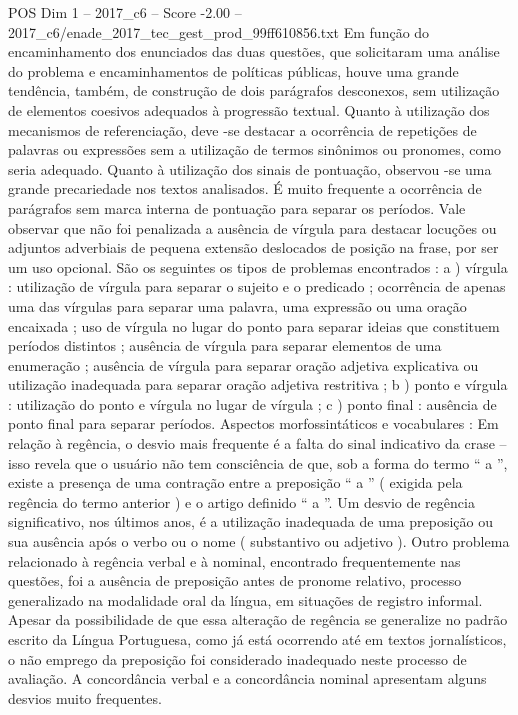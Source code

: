 \begin{textsample}{POS Dim 1 – 2017\_c6 – Score -2.00 – 2017\_c6/enade\_2017\_tec\_gest\_prod\_99ff610856.txt}
Em função do encaminhamento dos enunciados das duas questões, que solicitaram uma análise do problema e encaminhamentos de políticas públicas, houve uma grande tendência, também, de construção de dois parágrafos desconexos, sem utilização de elementos coesivos adequados à progressão textual.
Quanto à utilização dos mecanismos de referenciação, deve -se destacar a ocorrência de repetições de palavras ou expressões sem a utilização de termos sinônimos ou pronomes, como seria adequado.
Quanto à utilização dos sinais de pontuação, observou -se uma grande precariedade nos textos analisados.
É muito frequente a ocorrência de parágrafos sem marca interna de pontuação para separar os períodos.
Vale observar que não foi penalizada a ausência de vírgula para destacar locuções ou adjuntos adverbiais de pequena extensão deslocados de posição na frase, por ser um uso opcional.
São os seguintes os tipos de problemas encontrados : a ) vírgula : utilização de vírgula para separar o sujeito e o predicado ; ocorrência de apenas uma das vírgulas para separar uma palavra, uma expressão ou uma oração encaixada ; uso de vírgula no lugar do ponto para separar ideias que constituem períodos distintos ; ausência de vírgula para separar elementos de uma enumeração ; ausência de vírgula para separar oração adjetiva explicativa ou utilização inadequada para separar oração adjetiva restritiva ; b ) ponto e vírgula : utilização do ponto e vírgula no lugar de vírgula ; c ) ponto final : ausência de ponto final para separar períodos.
Aspectos morfossintáticos e vocabulares : Em relação à regência, o desvio mais frequente é a falta do sinal indicativo da crase – isso revela que o usuário não tem consciência de que, sob a forma do termo “ a ”, existe a presença de uma contração entre a preposição “ a ” ( exigida pela regência do termo anterior ) e o artigo definido “ a ”.
Um desvio de regência significativo, nos últimos anos, é a utilização inadequada de uma preposição ou sua ausência após o verbo ou o nome ( substantivo ou adjetivo ).
Outro problema relacionado à regência verbal e à nominal, encontrado frequentemente nas questões, foi a ausência de preposição antes de pronome relativo, processo generalizado na modalidade oral da língua, em situações de registro informal.
Apesar da possibilidade de que essa alteração de regência se generalize no padrão escrito da Língua Portuguesa, como já está ocorrendo até em textos jornalísticos, o não emprego da preposição foi considerado inadequado neste processo de avaliação.
A concordância verbal e a concordância nominal apresentam alguns desvios muito frequentes.

\end{textsample}
